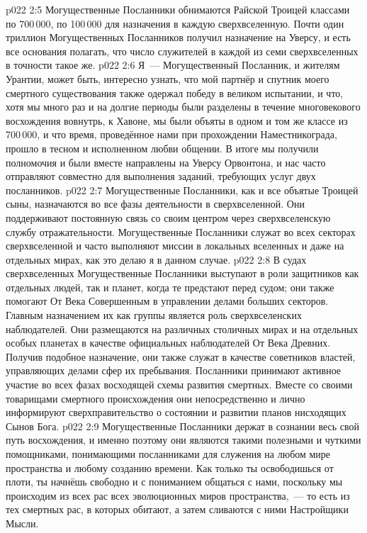 \vs p022 2:5 Могущественные Посланники обнимаются Райской Троицей классами по 700\,000, по 100\,000 для назначения в каждую сверхвселенную. Почти один триллион Могущественных Посланников получил назначение на Уверсу, и есть все основания полагать, что число служителей в каждой из семи сверхвселенных в точности такое же.
\vs p022 2:6 \pc Я~--- Могущественный Посланник, и жителям Урантии, может быть, интересно узнать, что мой партнёр и спутник моего смертного существования также одержал победу в великом испытании, и что, хотя мы много раз и на долгие периоды были разделены в течение многовекового восхождения вовнутрь, к Хавоне, мы были объяты в одном и том же классе из 700\,000, и что время, проведённое нами при прохождении Наместникограда, прошло в тесном и исполненном любви общении. В итоге мы получили полномочия и были вместе направлены на Уверсу Орвонтона, и нас часто отправляют совместно для выполнения заданий, требующих услуг двух посланников.
\vs p022 2:7 \pc Могущественные Посланники, как и все объятые Троицей сыны, назначаются во все фазы деятельности в сверхвселенной. Они поддерживают постоянную связь со своим центром через сверхвселенскую службу отражательности. Могущественные Посланники служат во всех секторах сверхвселенной и часто выполняют миссии в локальных вселенных и даже на отдельных мирах, как это делаю я в данном случае.
\vs p022 2:8 В судах сверхвселенных Могущественные Посланники выступают в роли защитников как отдельных людей, так и планет, когда те предстают перед судом; они также помогают От Века Совершенным в управлении делами больших секторов. Главным назначением их как группы является роль сверхвселенских наблюдателей. Они размещаются на различных столичных мирах и на отдельных особых планетах в качестве официальных наблюдателей От Века Древних. Получив подобное назначение, они также служат в качестве советников властей, управляющих делами сфер их пребывания. Посланники принимают активное участие во всех фазах восходящей схемы развития смертных. Вместе со своими товарищами смертного происхождения они непосредственно и лично информируют сверхправительство о состоянии и развитии планов нисходящих Сынов Бога.
\vs p022 2:9 Могущественные Посланники держат в сознании весь свой путь восхождения, и именно поэтому они являются такими полезными и чуткими помощниками, понимающими посланниками для служения на любом мире пространства и любому созданию времени. Как только ты освободишься от плоти, ты начнёшь свободно и с пониманием общаться с нами, поскольку мы происходим из всех рас всех эволюционных миров пространства,~--- то есть из тех смертных рас, в которых обитают, а затем сливаются с ними Настройщики Мысли.
